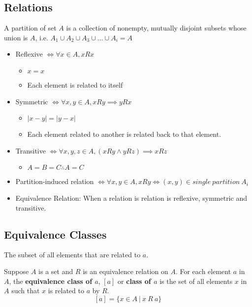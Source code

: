 \documentclass[landscape, letterpaper]{article}
\begin{document}
\begin{multicols}{2}
    \section*{Relations}
    A partition of set $A$ is a collection of nonempty, mutually disjoint subsets whose union is $A$, i.e. $A_1 \cup A_2 \cup A_3 \cup \ldots \cup A_i = A$
    \begin{itemize}
        \item Reflexive $ \iff \forall x \in A, x R x$
              \begin{itemize}
                  \item $x=x$
                  \item Each element is related to itself
              \end{itemize}
        \item Symmetric $ \iff \forall x, y \in A, x R y \implies y R x$
              \begin{itemize}
                  \item $|x-y| = |y-x|$
                  \item Each element related to another is related back to that element.
              \end{itemize}
        \item Transitive $\iff \forall x, y, z \in A, (x R y \land y R z)\implies x R z$
              \begin{itemize}
                  \item $A = B = C \therefore A=C$
              \end{itemize}
        \item Partition-induced relation $\iff \forall x, y \in A, x R y \iff (x, y) \in single~partition~A_i$
        \item Equivalence Relation: When a relation is relation is reflexive, symmetric and transitive.
    \end{itemize}
    \subsection*{Equivalence Classes}
    The subset of all elements that are related to $a$.

    Suppose $A$ is a set and $R$ is an equivalence relation on $A$. For each element $a$ in $A$, the \textbf{equivalence class of $a$}, $[a]$ or \textbf{class of $a$} is the set of all elements $x$ in $A$ such that $x$ is related to $a$ by $R$. $$[a] = \{x \in A~|~x~R~a\}$$


\end{multicols}
\end{document}
